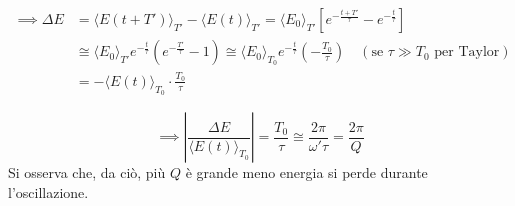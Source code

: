 \documentclass{article}
\begin{document}
\begin{align*}
\implies \Delta E &= \langle E(t+T') \rangle_{T'} - \langle E(t) \rangle_{T'} = \langle E_0 \rangle_{T'} \left[ e^{-\frac{t+T'}{\tau}} - e^{-\frac{t}{\tau}} \right] \\
&\cong \langle E_0 \rangle_{T'} e^{-\frac{t}{\tau}} \left( e^{-\frac{T'}{\tau}} - 1 \right) \cong \langle E_0 \rangle_{T_0} e^{-\frac{t}{\tau}} \left( -\frac{T_0}{\tau} \right) \quad (\text{se } \tau \gg T_0 \text{ per Taylor}) \\
&= - \langle E(t) \rangle_{T_0} \cdot \frac{T_0}{\tau}
\end{align*}

\begin{equation*}
\implies \left| \frac{\Delta E}{\langle E(t) \rangle_{T_0}} \right| = \frac{T_0}{\tau} \cong \frac{2\pi}{\omega' \tau} = \frac{2\pi}{Q}
\end{equation*}
Si osserva che, da ciò, più $Q$ è grande meno energia si perde durante l'oscillazione.
\end{document}
